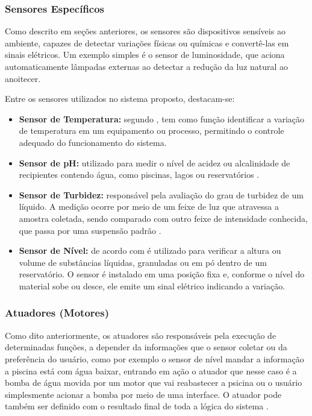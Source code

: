         \subsubsection*{Sensores Específicos}
            Como descrito em seções anteriores, os sensores são dispositivos sensíveis ao ambiente, capazes de detectar variações físicas ou químicas e convertê-las em sinais elétricos. Um exemplo simples é o sensor de luminosidade, que aciona automaticamente lâmpadas externas ao detectar a redução da luz natural ao anoitecer. 
            
            Entre os sensores utilizados no sistema proposto, destacam-se:

            \begin{itemize}

                \item \textbf{Sensor de Temperatura:} 
                    segundo \cite{leite2020plataforma}, tem como função identificar a variação de temperatura em um equipamento ou processo, permitindo o controle adequado do funcionamento do sistema.

                \item \textbf{Sensor de pH:} 
                    utilizado para medir o nível de acidez ou alcalinidade de recipientes contendo água, como piscinas, lagos ou reservatórios \cite{leite2020plataforma}.
                
                \item \textbf{Sensor de Turbidez:}
                    responsável pela avaliação do grau de turbidez de um líquido. A medição ocorre por meio de um feixe de luz que atravessa a amostra coletada, sendo comparado com outro feixe de intensidade conhecida, que passa por uma suspensão padrão \cite{cardoso2011sensor}.
                
                \item \textbf{Sensor de Nível:}
                    de acordo com \cite{souza2018sensor} é utilizado para verificar a altura ou volume de substâncias líquidas, granuladas ou em pó dentro de um reservatório. O sensor é instalado em uma posição fixa e, conforme o nível do material sobe ou desce, ele emite um sinal elétrico indicando a variação. 
                
            \end{itemize}

        \subsubsection*{Atuadores (Motores)} 
            Como dito anteriormente, os atuadores são responsáveis pela execução de determinadas funções, a depender da informações que o sensor coletar ou da preferência do usuário, como por exemplo o sensor de nível mandar a informação a piscina está com água baixar, entrando em ação o atuador que nesse caso é a bomba de água movida por um motor que vai reabastecer a psicina ou o usuário simplesmente acionar a bomba por meio de uma interface. O atuador pode também ser definido com o resultado final de toda a lógica do sistema \cite{florencio2015central}.

